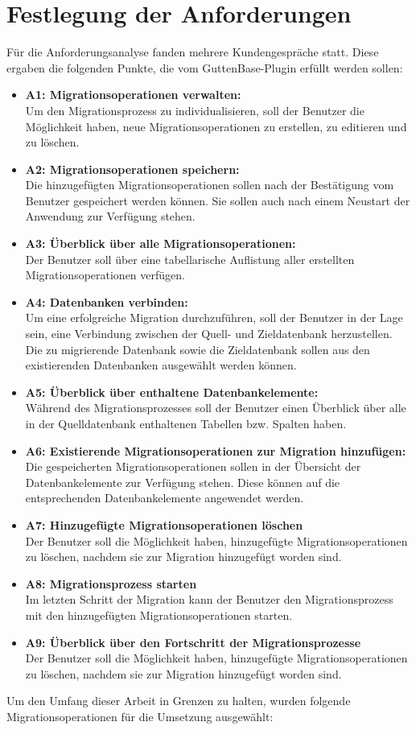 \section{Festlegung der Anforderungen}
Für die Anforderungsanalyse fanden mehrere Kundengespräche statt. Diese ergaben die folgenden Punkte, die vom GuttenBase-Plugin erfüllt werden sollen:
\begin{itemize}
	\item \textbf{A1: Migrationsoperationen verwalten:}\\
	Um den Migrationsprozess zu individualisieren, soll der Benutzer die Möglichkeit haben, neue Migrationsoperationen zu erstellen, zu editieren und zu löschen.
	\item \textbf{A2: Migrationsoperationen speichern:} \\
	Die hinzugefügten Migrationsoperationen sollen nach der Bestätigung vom Benutzer gespeichert werden können. Sie sollen auch nach einem Neustart der Anwendung zur Verfügung stehen.
	\item \textbf{A3: Überblick über alle Migrationsoperationen:}\\
	Der Benutzer soll über eine tabellarische Auflistung aller erstellten Migrationsoperationen verfügen.
	\item \textbf{A4: Datenbanken verbinden:} \\
	Um eine erfolgreiche Migration durchzuführen, soll der Benutzer in der Lage sein, eine Verbindung zwischen der Quell- und Zieldatenbank herzustellen. Die zu migrierende Datenbank sowie die Zieldatenbank sollen aus den existierenden Datenbanken ausgewählt werden können.
	\item \textbf{A5: Überblick über enthaltene Datenbankelemente:}\\
	Während des Migrationsprozesses soll der Benutzer einen Überblick über alle in der Quelldatenbank enthaltenen Tabellen bzw. Spalten haben.
	\item \textbf{A6: Existierende Migrationsoperationen zur Migration hinzufügen:}\\
	Die gespeicherten Migrationsoperationen sollen in der Übersicht der Datenbankelemente zur Verfügung stehen. Diese können auf die entsprechenden Datenbankelemente angewendet werden.
	\item \textbf{A7: Hinzugefügte Migrationsoperationen löschen}\\	
	Der Benutzer soll die Möglichkeit haben, hinzugefügte Migrationsoperationen zu löschen, nachdem sie zur Migration hinzugefügt worden sind.
	\item \textbf{A8: Migrationsprozess starten} \\
	Im letzten Schritt der Migration kann der Benutzer den Migrationsprozess mit den hinzugefügten Migrationsoperationen starten.	
	\item \textbf{A9: Überblick über den Fortschritt der Migrationsprozesse}\\
	Der Benutzer soll die Möglichkeit haben, hinzugefügte Migrationsoperationen zu löschen, nachdem sie zur Migration hinzugefügt worden sind.
\end{itemize}
Um den Umfang dieser Arbeit in Grenzen zu halten, wurden folgende Migrationsoperationen für die Umsetzung ausgewählt:

